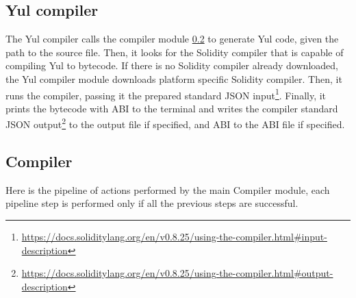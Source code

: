 \subsection{Yul compiler}
The Yul compiler calls the compiler module \ref{ssec:compiler} to generate Yul code, given the path to the source file. Then, it looks for the Solidity compiler that is capable of compiling Yul to bytecode. If there is no Solidity compiler already downloaded, the Yul compiler module downloads platform specific Solidity compiler. Then, it runs the compiler, passing it the prepared standard JSON input\footnote{\url{https://docs.soliditylang.org/en/v0.8.25/using-the-compiler.html\#input-description}}. Finally, it prints the bytecode with ABI to the terminal and writes the compiler standard JSON output\footnote{\url{https://docs.soliditylang.org/en/v0.8.25/using-the-compiler.html\#output-description}} to the output file if specified, and ABI to the ABI file if specified.
\subsection{Compiler}
\label{ssec:compiler}
Here is the pipeline of actions performed by the main Compiler module, each pipeline step is performed only if all the previous steps are successful.

